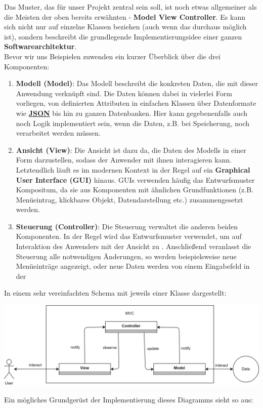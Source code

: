 \documentclass{article}
\begin{document}
Das Muster, das für unser Projekt zentral sein soll, ist noch etwas allgemeiner als die Meisten der oben bereits erwähnten - \textbf{Model View Controller}. Es kann sich nicht nur auf einzelne Klassen beziehen (auch wenn das durchaus möglich ist), sondern beschreibt die grundlegende Implementierungsidee einer ganzen \textbf{Softwarearchitektur}. \\
Bevor wir uns Beispielen zuwenden ein kurzer Überblick über die drei Komponenten:
\begin{enumerate}
    \item \textbf{Modell (Model)}: Das Modell beschreibt die konkreten Daten, die mit dieser Anwendung verknüpft sind. Die Daten können dabei in vielerlei Form vorliegen, von definierten Attributen in einfachen Klassen über Datenformate wie \textbf{\href{https://de.wikipedia.org/wiki/JavaScript_Object_Notation}{JSON}} bis hin zu ganzen Datenbanken. Hier kann gegebenenfalls auch noch Logik implementiert sein, wenn die Daten, z.B. bei Speicherung, noch verarbeitet werden müssen.
    \item \textbf{Ansicht (View)}: Die Ansicht ist dazu da, die Daten des Modells in einer Form darzustellen, sodass der Anwender mit ihnen interagieren kann. Letztendlich läuft es im modernen Kontext in der Regel auf ein \textbf{Graphical User Interface (GUI)} hinaus. GUIs verwenden häufig das Entwurfsmuster Kompositum, da sie aus Komponenten mit ähnlichen Grundfunktionen (z.B. Menüeintrag, klickbares Objekt, Datendarstellung etc.) zusammengesetzt werden. 
    \item \textbf{Steuerung (Controller)}: Die Steuerung verwaltet die anderen beiden Komponenten. In der Regel wird das Entwurfsmuster  verwendet, um auf Interaktion des Anwenders mit der Ansicht zu . Anschließend veranlasst die Steuerung alle notwendigen Änderungen, so werden beispielsweise neue Menüeinträge angezeigt, oder neue Daten werden von einem Eingabefeld in der 
\end{enumerate}

In einem sehr vereinfachten Schema mit jeweils einer Klasse dargestellt:
\begin{center}
    \includegraphics[scale=0.2]{../../media/mvc.png}
\end{center}
Ein mögliches Grundgerüst der Implementierung dieses Diagramms sieht so aus: 
\end{document}
